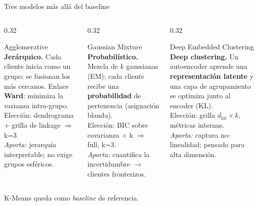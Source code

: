 \documentclass[aspectratio=169,10pt]{beamer}
\newcommand{\highlight}[1]{\textcolor{DeepTeal}{\textbf{#1}}}
\newcommand{\smallnote}[1]{{\scriptsize\textcolor{Muted}{#1}}}
\begin{document}
\begin{frame}{Tres modelos m\'as all\'a del baseline}
  \begin{columns}[T,onlytextwidth]
    \begin{column}{0.32\textwidth}
      \begin{block}{Agglomerative}
        \footnotesize
        \textbf{Jer\'arquico.} Cada cliente inicia como un grupo; se fusionan los m\'as cercanos. Enlace \highlight{Ward}: minimiza la varianza intra-grupo.\\[0.15cm]
        \smallnote{Elecci\'on: dendrograma + grilla de linkage $\Rightarrow$ k=3.}\\[0.12cm]
        \emph{Aporta:} jerarqu\'ia interpretable; no exige grupos esf\'ericos.
      \end{block}
    \end{column}
    \begin{column}{0.32\textwidth}
      \begin{block}{Gaussian Mixture}
        \footnotesize
        \textbf{Probabil\'istico.} Mezcla de $k$ gaussianas (EM); cada cliente recibe una \highlight{probabilidad} de pertenencia (asignaci\'on blanda).\\[0.15cm]
        \smallnote{Elecci\'on: BIC sobre covarianza $\times$ k $\Rightarrow$ full, k=3.}\\[0.12cm]
        \emph{Aporta:} cuantifica la incertidumbre $\to$ clientes fronterizos.
      \end{block}
    \end{column}
    \begin{column}{0.32\textwidth}
      \begin{block}{Deep Embedded Clustering}
        \footnotesize
        \textbf{Deep clustering.} Un autoencoder aprende una \highlight{representaci\'on latente} y una capa de agrupamiento se optimiza junto al encoder (KL).\\[0.15cm]
        \smallnote{Elecci\'on: grilla $d_{\mathrm{lat}}\times k$, m\'etricas internas.}\\[0.12cm]
        \emph{Aporta:} captura no-linealidad; pensado para alta dimensi\'on.
      \end{block}
    \end{column}
  \end{columns}
  \vspace{0.25cm}
  \smallnote{K-Means queda como \emph{baseline} de referencia.}
\end{frame}
\end{document}
